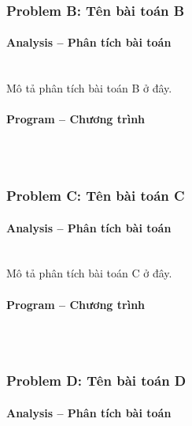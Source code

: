 \documentclass{article}
\begin{document}
\subsubsection{Problem B: Tên bài toán B}

\paragraph{Analysis -- Phân tích bài toán} \mbox{} \\

Mô tả phân tích bài toán B ở đây.

\paragraph{Program -- Chương trình} \mbox{} \\

\begin{lstlisting}

\end{lstlisting}

\subsubsection{Problem C: Tên bài toán C}

\paragraph{Analysis -- Phân tích bài toán} \mbox{} \\

Mô tả phân tích bài toán C ở đây.

\paragraph{Program -- Chương trình} \mbox{} \\

\begin{lstlisting}

\end{lstlisting}

\subsubsection{Problem D: Tên bài toán D}

\paragraph{Analysis -- Phân tích bài toán} \mbox{} \\
\end{document}
